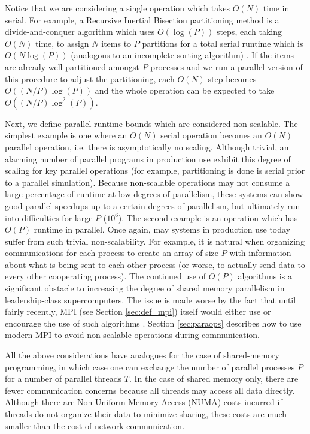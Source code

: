 Notice that we are considering a single operation which takes $O(N)$
time in serial.
For example, a Recursive Inertial Bisection partitioning method is a
divide-and-conquer algorithm which uses $O(\log(P))$ steps, each
taking $O(N)$ time, to assign $N$ items to $P$ partitions
for a total serial runtime which is $O(N\log(P))$
(analogous to an incomplete sorting algorithm)
\cite{simon1991partitioning}.
If the items are already well partitioned amongst $P$ processes
and we run a parallel version of this procedure to adjust the
partitioning, each $O(N)$ step becomes $O((N/P)\log(P))$
and the whole operation can be expected to take $O((N/P)\log^2(P))$.

Next, we define parallel runtime bounds which are considered non-scalable.
The simplest example is one where an $O(N)$ serial operation becomes
an $O(N)$ parallel operation, i.e. there is asymptotically no scaling.
Although trivial, an alarming number of parallel programs in production
use exhibit this degree of scaling for key parallel operations
(for example, partitioning is done is serial prior to a parallel simulation).
Because non-scalable operations may not consume a large percentage
of runtime at low degrees of parallelism,
these systems can show good parallel speedups up to a certain degrees of parallelism,
but ultimately run into difficulties for large $P$ ($10^6$).
The second example is an operation which has $O(P)$ runtime in parallel.
Once again, may systems in production use today suffer from such
trivial non-scalability.
For example, it is natural when organizing communications for each process to create
an array of size $P$ with information about what is being sent to each
other process (or worse, to actually send data to every other cooperating process).
The continued use of $O(P)$ algorithms is a significant obstacle to
increasing the degree of shared memory parallelism in leadership-class supercomputers.
The issue is made worse by the fact that until fairly recently,
MPI (see Section \ref{sec:def_mpi}) itself would either use
or encourage the use of such algorithms \cite{balaji2009mpi}.
Section \ref{sec:paraops} describes how to use modern MPI
to avoid non-scalable operations during communication.

All the above considerations have analogues for the case of shared-memory programming,
in which case one can exchange the number of parallel processes $P$ for a number
of parallel threads $T$.
In the case of shared memory only, there are fewer communication concerns because
all threads may access all data directly.
Although there are Non-Uniform Memory Access (NUMA) costs incurred if threads do
not organize their data to minimize sharing, these costs are much smaller than
the cost of network communication.

